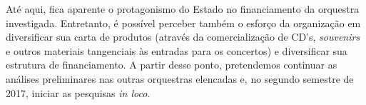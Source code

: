 \documentclass[a4paper, 12pt, openright, oneside, german, french, english, brazil]{abntex2}
\begin{document}







	Até aqui, fica aparente o protagonismo do Estado no financiamento da orquestra investigada. Entretanto, é possível perceber também o esforço da organização em diversificar sua carta de produtos (através da comercialização de CD's, \textit{souvenirs} e outros materiais tangenciais às entradas para os concertos) e diversificar sua estrutura de financiamento. A partir desse ponto, pretendemos continuar as análises preliminares nas outras orquestras elencadas e, no segundo semestre de 2017, iniciar as pesquisas \textit{in loco}.
\end{document}
